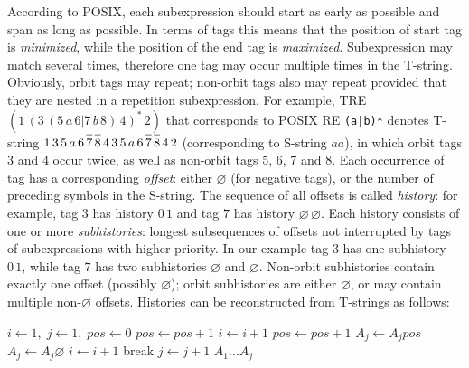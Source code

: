 \documentclass{article}
\newcommand{\Xset}{\!\leftarrow\!}
\newcommand{\Xin}{\!\in\!}
\newcommand{\Xeq}{\!=\!}
\newcommand*{\Xbar}[1]{\overline{#1\vphantom{\bar{#1}}}}
\theoremstyle{definition}
\begin{document}
\begin{multicols}{2}
According to POSIX, each subexpression should start as early as possible and span as long as possible.
In terms of tags this means that the position of start tag is \emph{minimized},
while the position of the end tag is \emph{maximized}.
Subexpression may match several times, therefore one tag may occur multiple times in the T-string.
Obviously, orbit tags may repeat;
non-orbit tags also may repeat provided that they are nested in a repetition subexpression.
For example, TRE $(1 \, (3 \, (5 \, a \, 6 | 7 \, b \, 8) \, 4)^* \, 2)$ that corresponds to POSIX RE \texttt{(a|b)*}
denotes T-string $1\, 3\, 5\, a\, 6\, \Xbar{7}\, \Xbar{8}\, 4\, 3\, 5\, a\, 6\, \Xbar{7}\, \Xbar{8}\, 4\, 2$
(corresponding to S-string $aa$),
in which orbit tags $3$ and $4$ occur twice, as well as non-orbit tags $5$, $6$, $7$ and $8$.
Each occurrence of tag has a corresponding \emph{offset}:
either $\varnothing$ (for negative tags), or the number of preceding symbols in the S-string.
The sequence of all offsets is called \emph{history}:
for example, tag $3$ has history $0 \, 1$ and tag $7$ has history $\varnothing \, \varnothing$.
Each history consists of one or more \emph{subhistories}:
longest subsequences of offsets not interrupted by tags of subexpressions with higher priority.
In our example tag $3$ has one subhistory $0 \, 1$, while tag $7$ has two subhistories $\varnothing$ and $\varnothing$.
Non-orbit subhistories contain exactly one offset (possibly $\varnothing$);
orbit subhistories are either $\varnothing$, or may contain multiple non-$\varnothing$ offsets.
Histories can be reconstructed from T-strings as follows:

    \begin{algorithm}[H] \DontPrintSemicolon {} 
     {
        $i \Xset 1, \; j \Xset 1, \; pos \Xset 0$ \;
         {
            \While {$i \leq n$ and $a_i \!\not\in\! \{t, \Xbar{t}\}$} {
                \lIf {$a_i \Xin \Sigma$} {$pos \Xset pos \!+\! 1$}
                $i \Xset i \!+\! 1$ \;
            }
             {
                \lIf {$a_i \Xin \Sigma$}   {$pos \Xset pos \!+\! 1$}
                \lIf {$a_i \Xeq t$}        {$A_j \Xset A_j pos$}
                \lIf {$a_i \Xeq \Xbar{t}$} {$A_j \Xset A_j \varnothing$}
                $i \Xset i \!+\! 1$ \;
            }
             {break}
            $j \Xset j \!+\! 1$ \;
        }
        \Return $A_1 \dots A_j$ \;
    }
    \end{algorithm}


\end{multicols}
\end{document}
